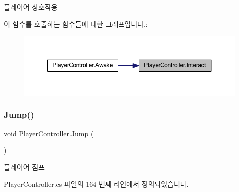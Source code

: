 플레이어 상호작용 

이 함수를 호출하는 함수들에 대한 그래프입니다.\+:\nopagebreak
\begin{figure}[H]
\begin{center}
\leavevmode
\includegraphics[width=350pt]{dc/dde/class_player_controller_a1f27776786e67be2633f94b97c93ebdc_icgraph}
\end{center}
\end{figure}
\mbox{\label{class_player_controller_a8a7010cb6f3c524737be3f6f77553df9}} 
\subsubsection{\texorpdfstring{Jump()}{Jump()}}
{\footnotesize\ttfamily void Player\+Controller.\+Jump (\begin{DoxyParamCaption}{ }\end{DoxyParamCaption})}



플레이어 점프 



Player\+Controller.\+cs 파일의 164 번째 라인에서 정의되었습니다.


